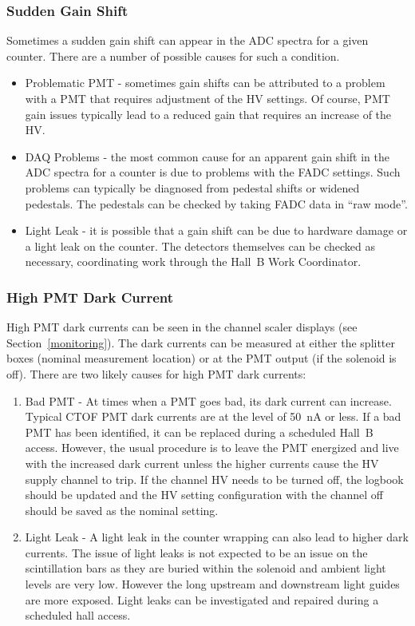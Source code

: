 \documentclass[12pt]{article}
\begin{document}
\subsubsection{Sudden Gain Shift}
\label{gain-shift}

Sometimes a sudden gain shift can appear in the ADC spectra for a given counter. There are a number of
possible causes for such a condition.

\begin{itemize}
\item Problematic PMT - sometimes gain shifts can be attributed to a problem with a PMT that requires 
adjustment of the HV settings. Of course, PMT gain issues typically lead to a reduced gain that 
requires an increase of the HV. 
\item DAQ Problems - the most common cause for an apparent gain shift in the ADC spectra for a counter 
is due to problems with the FADC settings. Such problems can typically be diagnosed from pedestal shifts 
or widened pedestals. The pedestals can be checked by taking FADC data in ``raw mode''. 
\item Light Leak - it is possible that a gain shift can be due to hardware damage or a light leak on 
the counter. The detectors themselves can be checked as necessary, coordinating work through the Hall~B 
Work Coordinator.
\end{itemize}

\subsubsection{High PMT Dark Current}
\label{high-current}

High PMT dark currents can be seen in the channel scaler displays (see Section~\ref{monitoring}). The 
dark currents can be measured at either the splitter boxes (nominal measurement location) or at the 
PMT output (if the solenoid is off). There are two likely causes for high PMT dark currents:

\begin{enumerate}
\item Bad PMT - At times when a PMT goes bad, its dark current can increase. Typical CTOF PMT dark 
currents are at the level of 50~nA or less. If a bad PMT has been identified, it can be replaced
during a scheduled Hall~B access. However, the usual procedure is to leave the PMT energized and 
live with the increased dark current unless the higher currents cause the HV supply channel to trip. 
If the channel HV needs to be turned off, the logbook should be updated and the HV setting 
configuration with the channel off should be saved as the nominal setting.
\item Light Leak - A light leak in the counter wrapping can also lead to higher dark currents. The 
issue of light leaks is not expected to be an issue on the scintillation bars as they are buried 
within the solenoid and ambient light levels are very low. However the long upstream and downstream
light guides are more exposed. Light leaks can be investigated and repaired during a scheduled hall
access.
\end{enumerate}
\end{document}
